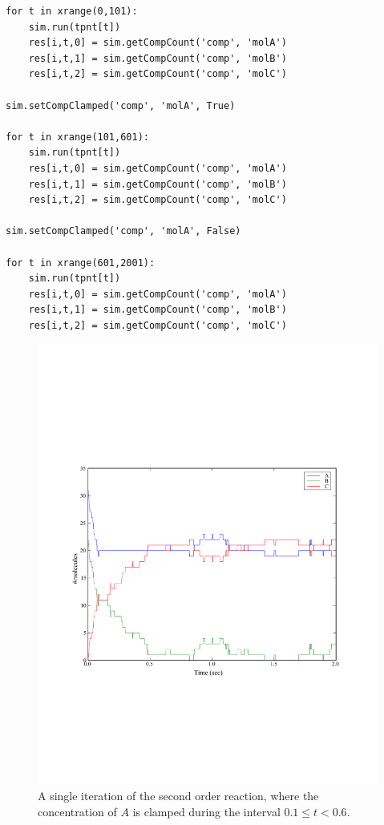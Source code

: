 \documentclass[a4paper,12pt]{book}
\begin{document}
\begin{verbatim}
for t in xrange(0,101):
    sim.run(tpnt[t])
    res[i,t,0] = sim.getCompCount('comp', 'molA')
    res[i,t,1] = sim.getCompCount('comp', 'molB')
    res[i,t,2] = sim.getCompCount('comp', 'molC')
    
sim.setCompClamped('comp', 'molA', True)

for t in xrange(101,601):
    sim.run(tpnt[t])
    res[i,t,0] = sim.getCompCount('comp', 'molA')
    res[i,t,1] = sim.getCompCount('comp', 'molB')
    res[i,t,2] = sim.getCompCount('comp', 'molC')
    
sim.setCompClamped('comp', 'molA', False)

for t in xrange(601,2001):
    sim.run(tpnt[t])
    res[i,t,0] = sim.getCompCount('comp', 'molA')
    res[i,t,1] = sim.getCompCount('comp', 'molB')
    res[i,t,2] = sim.getCompCount('comp', 'molC')
\end{verbatim}

\begin{figure}
\centering
\includegraphics[width=13cm]{chap02_secondorderreaction05.pdf}
\caption{A single iteration of the second order reaction, where the concentration of $A$ is clamped during the interval $0.1 \leq t < 0.6$.}
\label{fig:chap02:secondorderreaction05}
\end{figure}
\end{document}
